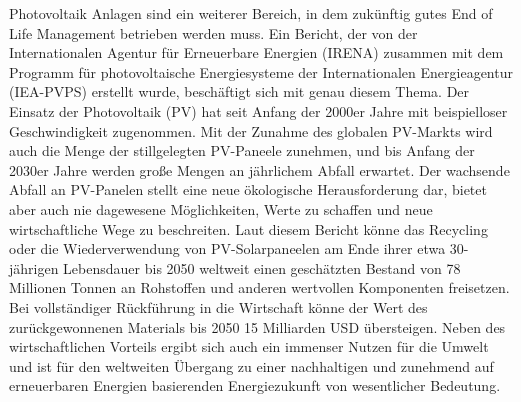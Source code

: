 \documentclass[13pt,titlepage]{article}
\begin{document}
Photovoltaik Anlagen sind ein weiterer Bereich, in dem zukünftig gutes End of Life Management betrieben werden muss. Ein Bericht, der von der Internationalen Agentur für Erneuerbare Energien (IRENA) zusammen mit dem Programm für photovoltaische Energiesysteme der Internationalen Energieagentur (IEA-PVPS) erstellt wurde, beschäftigt sich mit genau diesem Thema. Der Einsatz der Photovoltaik (PV) hat seit Anfang der 2000er Jahre mit beispielloser Geschwindigkeit zugenommen. Mit der Zunahme des globalen PV-Markts wird auch die Menge der stillgelegten PV-Paneele zunehmen, und bis Anfang der 2030er Jahre werden große Mengen an jährlichem Abfall erwartet. Der wachsende Abfall an PV-Panelen stellt eine neue ökologische Herausforderung dar, bietet aber auch nie dagewesene Möglichkeiten, Werte zu schaffen und neue wirtschaftliche Wege zu beschreiten. Laut diesem Bericht könne das Recycling oder die Wiederverwendung von PV-Solarpaneelen am Ende ihrer etwa 30-jährigen Lebensdauer bis 2050 weltweit einen geschätzten Bestand von 78 Millionen Tonnen an Rohstoffen und anderen wertvollen Komponenten freisetzen. Bei vollständiger Rückführung in die Wirtschaft könne der Wert des zurückgewonnenen Materials bis 2050 15 Milliarden USD übersteigen. Neben des wirtschaftlichen Vorteils ergibt sich auch ein immenser Nutzen für die Umwelt und ist für den weltweiten Übergang zu einer nachhaltigen und zunehmend auf erneuerbaren Energien basierenden Energiezukunft von wesentlicher Bedeutung.\cite{pv}


\newpage

\printbibliography
\end{document}

